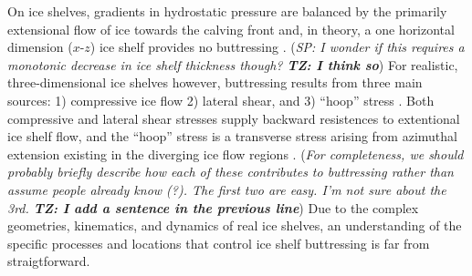 \documentclass[review,oneside]{igs}
\begin{document}
On ice shelves, gradients in hydrostatic pressure are balanced by the primarily extensional flow of ice towards the calving front \citep{hutter1983, morland1987, schoof2007} and, in theory, a one horizontal dimension ($x$-$z$) ice shelf provides no buttressing \citep{schoof2007,gudmundsson2013}. (\textit{SP: I wonder if this requires a monotonic decrease in ice shelf thickness though? \bf{TZ: I think so}}) For realistic, three-dimensional ice shelves however,  buttressing results from three main sources: 1) compressive ice flow 2) lateral shear, and 3) ``hoop'' stress \citep{pegler2012}. Both compressive and lateral shear stresses supply backward resistences to extentional ice shelf flow, and the ``hoop'' stress is a transverse stress arising from azimuthal extension existing in the diverging ice flow regions \citep{wearing2016}. (\textit{For completeness, we should probably briefly describe how each of these contributes to buttressing rather than assume people already know (?). The first two are easy. I'm not sure about the 3rd. \bf{TZ: I add a sentence in the previous line}}) Due to the complex geometries, kinematics, and dynamics of real ice shelves, an understanding of the specific processes and locations that control ice shelf buttressing is far from straigtforward.
\end{document}
